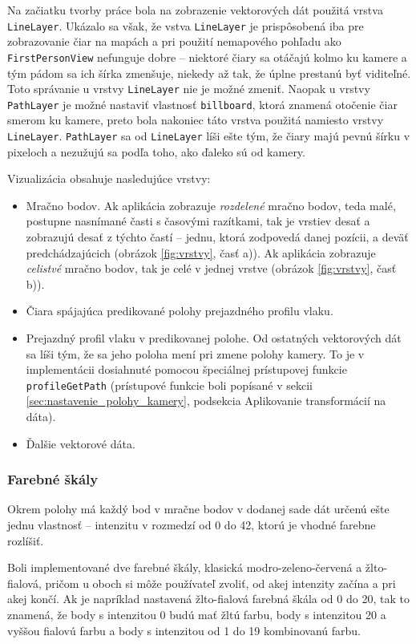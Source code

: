 Na začiatku tvorby práce bola na zobrazenie vektorových dát použitá vrstva \texttt{LineLayer}. Ukázalo sa však, že vstva \texttt{LineLayer} je prispôsobená iba pre zobrazovanie čiar na mapách a pri použití nemapového pohľadu ako \texttt{FirstPersonView} nefunguje dobre -- niektoré čiary sa otáčajú kolmo ku kamere a tým pádom sa ich šírka zmenšuje, niekedy až tak, že úplne prestanú byť viditeľné. Toto správanie u vrstvy \texttt{LineLayer} nie je možné zmeniť. Naopak u vrstvy \texttt{PathLayer} je možné nastaviť vlastnosť \texttt{billboard}, ktorá znamená otočenie čiar smerom ku kamere, preto bola nakoniec táto vrstva použitá namiesto vrstvy \texttt{LineLayer}. \texttt{PathLayer} sa od \texttt{LineLayer} líši ešte tým, že čiary majú pevnú šírku v pixeloch a nezužujú sa podľa toho, ako ďaleko sú od kamery.

Vizualizácia obsahuje nasledujúce vrstvy:
\begin{itemize}
    \item Mračno bodov. Ak aplikácia zobrazuje \emph{rozdelené} mračno bodov, teda malé, postupne nasnímané časti s časovými razítkami, tak je vrstiev desať a zobrazujú desať z týchto častí -- jednu, ktorá zodpovedá danej pozícii, a deväť predchádzajúcich (obrázok \ref{fig:vrstvy}, časť a)). Ak aplikácia zobrazuje \emph{celistvé} mračno bodov, tak je celé v jednej vrstve (obrázok \ref{fig:vrstvy}, časť b)).
    \item Čiara spájajúca predikované polohy prejazdného profilu vlaku.
    \item Prejazdný profil vlaku v predikovanej polohe. Od ostatných vektorových dát sa líši tým, že sa jeho poloha mení pri zmene polohy kamery. To je v implementácii dosiahnuté pomocou špeciálnej prístupovej funkcie \texttt{profileGetPath} (prístupové funkcie boli popísané v sekcii \ref{sec:nastavenie_polohy_kamery}, podsekcia Aplikovanie transformácií na dáta). 
    \item Ďalšie vektorové dáta.
\end{itemize}

\subsubsection{Farebné škály}

Okrem polohy má každý bod v mračne bodov v dodanej sade dát určenú ešte jednu vlastnosť -- intenzitu v rozmedzí od 0 do 42, ktorú je vhodné farebne rozlíšiť.

Boli implementované dve farebné škály, klasická modro-zeleno-červená a žlto-fialová, pričom u oboch si môže používateľ zvoliť, od akej intenzity začína a pri akej končí. Ak je napríklad nastavená žlto-fialová farebná škála od 0 do 20, tak to znamená, že body s intenzitou 0 budú mať žltú farbu, body s intenzitou 20 a vyššou fialovú farbu a body s intenzitou od 1 do 19 kombinovanú farbu.

